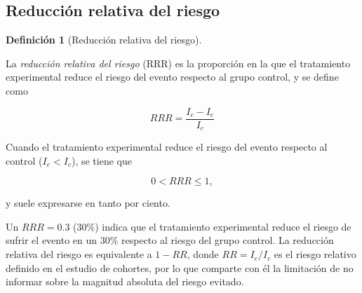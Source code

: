 \documentclass[
  spanish,
  a4paper,
]{scrreport}
\theoremstyle{definition}
\theoremstyle{definition}
\newtheorem{definition}{Definición}[chapter]
\theoremstyle{remark}
\begin{document}
\subsection{Reducción relativa del
riesgo}\label{reducciuxf3n-relativa-del-riesgo}

\begin{definition}[Reducción relativa del
riesgo]\protect\hypertarget{def-experimentales-rrr}{}\label{def-experimentales-rrr}

La \emph{reducción relativa del riesgo} (RRR) es la proporción en la que
el tratamiento experimental reduce el riesgo del evento respecto al
grupo control, y se define como

\[RRR = \frac{I_c - I_e}{I_c}\]

\end{definition}

\begin{tcolorbox}[enhanced jigsaw, arc=.35mm, bottomrule=.15mm, bottomtitle=1mm, breakable, colback=white, colbacktitle=quarto-callout-important-color!10!white, colframe=quarto-callout-important-color-frame, coltitle=black, left=2mm, leftrule=.75mm, opacityback=0, opacitybacktitle=0.6, rightrule=.15mm, title=\textcolor{quarto-callout-important-color}{\faExclamation}\hspace{0.5em}{Importante}, titlerule=0mm, toprule=.15mm, toptitle=1mm]

Cuando el tratamiento experimental reduce el riesgo del evento respecto
al control (\(I_e < I_c\)), se tiene que

\[0 < RRR \leq 1,\]

y suele expresarse en tanto por ciento.

\end{tcolorbox}

\begin{tcolorbox}[enhanced jigsaw, arc=.35mm, bottomrule=.15mm, bottomtitle=1mm, breakable, colback=white, colbacktitle=quarto-callout-note-color!10!white, colframe=quarto-callout-note-color-frame, coltitle=black, left=2mm, leftrule=.75mm, opacityback=0, opacitybacktitle=0.6, rightrule=.15mm, title=\textcolor{quarto-callout-note-color}{\faInfo}\hspace{0.5em}{Interpretación}, titlerule=0mm, toprule=.15mm, toptitle=1mm]

Un \(RRR = 0.3\) (30\%) indica que el tratamiento experimental reduce el
riesgo de sufrir el evento en un 30\% respecto al riesgo del grupo
control. La reducción relativa del riesgo es equivalente a \(1-RR\),
donde \(RR=I_e/I_c\) es el riesgo relativo definido en el estudio de
cohortes, por lo que comparte con él la limitación de no informar sobre
la magnitud absoluta del riesgo evitado.

\end{tcolorbox}
\end{document}
